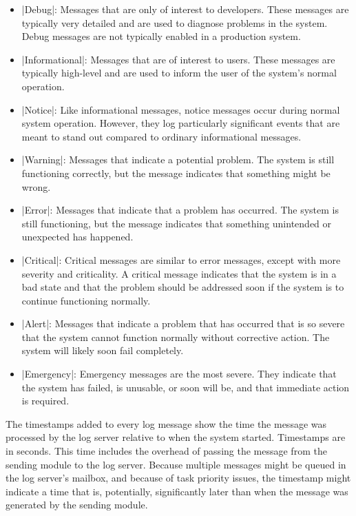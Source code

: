 \begin{itemize}
\item |Debug|: Messages that are only of interest to developers. These messages are typically
very detailed and are used to diagnose problems in the system. Debug messages are not typically
enabled in a production system.

\item |Informational|: Messages that are of interest to users. These messages are typically
high-level and are used to inform the user of the system's normal operation.

\item |Notice|: Like informational messages, notice messages occur during normal system
operation. However, they log particularly significant events that are meant to stand out
compared to ordinary informational messages.

\item |Warning|: Messages that indicate a potential problem. The system is still functioning
correctly, but the message indicates that something might be wrong.

\item |Error|: Messages that indicate that a problem has occurred. The system is still
functioning, but the message indicates that something unintended or unexpected has happened.

\item |Critical|: Critical messages are similar to error messages, except with more severity and
criticality. A critical message indicates that the system is in a bad state and that the problem
should be addressed soon if the system is to continue functioning normally.

\item |Alert|: Messages that indicate a problem that has occurred that is so severe that the
system cannot function normally without corrective action. The system will likely soon fail
completely.

\item |Emergency|: Emergency messages are the most severe. They indicate that the system has
failed, is unusable, or soon will be, and that immediate action is required.
\end{itemize}

The timestamps added to every log message show the time the message was processed by the log
server relative to when the system started. Timestamps are in seconds. This time includes the
overhead of passing the message from the sending module to the log server. Because multiple
messages might be queued in the log server's mailbox, and because of task priority issues, the
timestamp might indicate a time that is, potentially, significantly later than when the message
was generated by the sending module.

